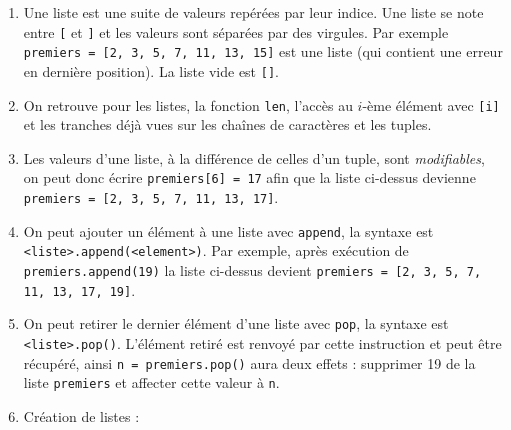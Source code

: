 \documentclass[11pt,a4paper]{article}
\begin{document}
	\begin{tcolorbox}[left=0cm,title=\bf{\faPython \; Listes},colbacktitle=cfond]
		\begin{enumerate}
			\item[\ding{182}] Une liste est une suite de valeurs repérées par leur indice. Une liste se note entre {\tt [} et {\tt]} et les valeurs sont séparées par des virgules. Par exemple \texttt{premiers = [2, 3, 5, 7, 11, 13, 15]} est une liste (qui contient une erreur en dernière position). La liste vide est {\tt []}.
			\item[\ding{183}] On retrouve pour les listes, la fonction {\tt len}, l'accès au $i$-ème élément avec {\tt [i]} et les tranches déjà vues sur les chaînes de caractères et les tuples.
			\item[\ding{184}] Les valeurs d'une liste, à la différence de celles d'un tuple, sont \textit{modifiables}, on peut donc écrire \texttt{premiers[6] = 17} afin que la liste ci-dessus devienne \texttt{premiers = [2, 3, 5, 7, 11, 13, 17]}.
			\item[\ding{185}] On peut ajouter un élément à une liste avec {\tt append}, la syntaxe est {\tt <liste>.append(<element>)}. Par exemple, après exécution de \texttt{premiers.append(19)} la liste ci-dessus devient \texttt{premiers = [2, 3, 5, 7, 11, 13, 17, 19]}.
			\item[\ding{186}] On peut retirer le dernier élément d'une liste avec {\tt pop}, la syntaxe est {\tt <liste>.pop()}. L'élément retiré est renvoyé par cette instruction et peut être récupéré, ainsi \texttt{n = premiers.pop()} aura deux effets : supprimer 19 de la liste {\tt premiers} et affecter cette valeur à {\tt n}.
			\item[\ding{187}] Création de listes :
		\end{enumerate}
	\end{tcolorbox}
	
\end{document}
